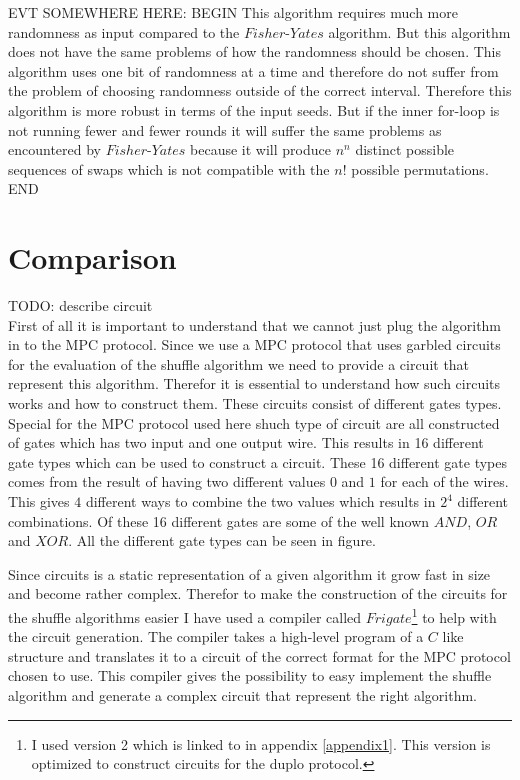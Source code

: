 \documentclass[twoside,11pt,openright]{report}
\newcommand{\todo}[1]{}
\renewcommand{\todo}[1]{{\color{red} TODO: {#1}} \\}
\begin{document}
EVT SOMEWHERE HERE:
BEGIN
This algorithm requires much more randomness as input compared to the $Fisher\text{-}Yates$ algorithm. But this algorithm does not have the same problems of how the randomness should be chosen. This algorithm uses one bit of randomness at a time and therefore do not suffer from the problem of choosing randomness outside of the correct interval. Therefore this algorithm is more robust in terms of the input seeds. But if the inner for-loop is not running fewer and fewer rounds it will suffer the same problems as encountered by $Fisher\text{-}Yates$ because it will produce $n^n$ distinct possible sequences of swaps which is not compatible with the $n!$ possible permutations.
END

\section{Comparison}
\label{sec:comp}
\todo{describe circuit}
First of all it is important to understand that we cannot just plug the algorithm in to the MPC protocol. Since we use a MPC protocol that uses garbled circuits for the evaluation of the shuffle algorithm we need to provide a circuit that represent this algorithm. Therefor it is essential to understand how such circuits works and how to construct them. These circuits consist of different gates types. Special for the MPC protocol used here shuch type of circuit are all constructed of gates which has two input and one output wire. This results in 16 different gate types which can be used to construct a circuit. These 16 different gate types comes from the result of having two different values $0$ and $1$ for each of the wires. This gives $4$ different ways to combine the two values which results in $2^4$ different combinations. Of these 16 different gates are some of the well known $AND$, $OR$ and $XOR$. All the different gate types can be seen in figure.

Since circuits is a static representation of a given algorithm it grow fast in size and become rather complex. Therefor to make the construction of the circuits for the shuffle algorithms easier I have used a compiler called $Frigate$\footnote{I used version 2 which is linked to in appendix \ref{appendix1}. This version is optimized to construct circuits for the duplo protocol.} to help with the circuit generation. The compiler takes a high-level program of a $C$ like structure and translates it to a circuit of the correct format for the MPC protocol chosen to use. This compiler gives the possibility to easy implement the shuffle algorithm and generate a complex circuit that represent the right algorithm.
\end{document}
